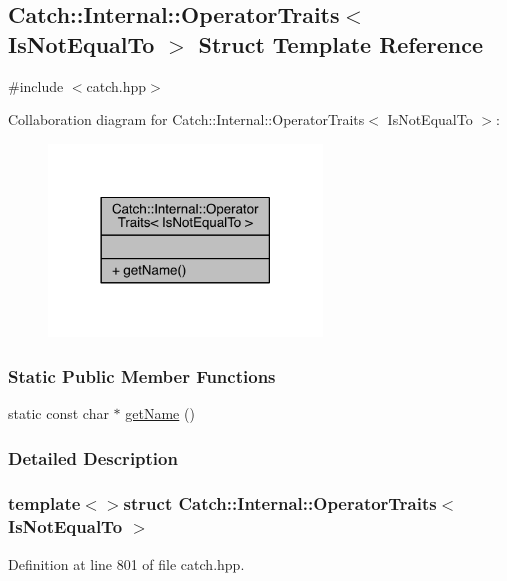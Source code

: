 \hypertarget{a00062}{}\subsection{Catch\+:\+:Internal\+:\+:Operator\+Traits$<$ Is\+Not\+Equal\+To $>$ Struct Template Reference}
\label{a00062}


{\ttfamily \#include $<$catch.\+hpp$>$}



Collaboration diagram for Catch\+:\+:Internal\+:\+:Operator\+Traits$<$ Is\+Not\+Equal\+To $>$\+:\nopagebreak
\begin{figure}[H]
\begin{center}
\leavevmode
\includegraphics[width=206pt]{a00334}
\end{center}
\end{figure}
\subsubsection*{Static Public Member Functions}
\begin{DoxyCompactItemize}
\item 
static const char $\ast$ \hyperlink{a00062_a54a795b8bf7c80a9fdbc7b81f39133b4}{get\+Name} ()
\end{DoxyCompactItemize}


\subsubsection{Detailed Description}
\subsubsection*{template$<$$>$struct Catch\+::\+Internal\+::\+Operator\+Traits$<$ Is\+Not\+Equal\+To $>$}



Definition at line 801 of file catch.\+hpp.



